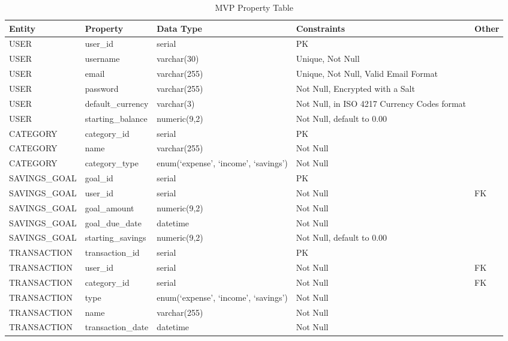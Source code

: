 \documentclass{l4proj}
\begin{document}
\begin{table}[htb]
    \centering
    \caption{MVP Property Table}
    \label{tab:mvp-database-table}
    \begin{adjustbox}{max width=\textwidth,center}
    \small
    \begin{tabular}{|l|l|l|l|l|}
        \hline
        \textbf{Entity} & \textbf{Property} & \textbf{Data Type} & \textbf{Constraints} & \textbf{Other} \\
        \hline
        USER & user\_id & serial & PK & \\
        USER & username & varchar(30) & Unique, Not Null & \\
        USER & email & varchar(255) & Unique, Not Null, Valid Email Format & \\
        USER & password & varchar(255) & Not Null, Encrypted with a Salt & \\
        USER & default\_currency & varchar(3) & Not Null, in ISO 4217 Currency Codes format & \\
        USER & starting\_balance & numeric(9,2) & Not Null, default to 0.00 & \\
        CATEGORY & category\_id & serial & PK & \\
        CATEGORY & name & varchar(255) & Not Null & \\
        CATEGORY & category\_type & enum(‘expense’, ‘income’, ‘savings’) & Not Null & \\
        SAVINGS\_GOAL & goal\_id & serial & PK & \\
        SAVINGS\_GOAL & user\_id & serial & Not Null & FK \\
        SAVINGS\_GOAL & goal\_amount & numeric(9,2) & Not Null & \\
        SAVINGS\_GOAL & goal\_due\_date & datetime & Not Null & \\
        SAVINGS\_GOAL & starting\_savings & numeric(9,2) & Not Null, default to 0.00 & \\
        TRANSACTION & transaction\_id & serial & PK & \\
        TRANSACTION & user\_id & serial & Not Null & FK \\
        TRANSACTION & category\_id & serial & Not Null & FK \\
        TRANSACTION & type & enum(‘expense’, ‘income’, ‘savings’) & Not Null & \\
        TRANSACTION & name & varchar(255) & Not Null & \\
        TRANSACTION & transaction\_date & datetime & Not Null & \\

\end{tabular}
\end{adjustbox}
\end{table}
\end{document}
